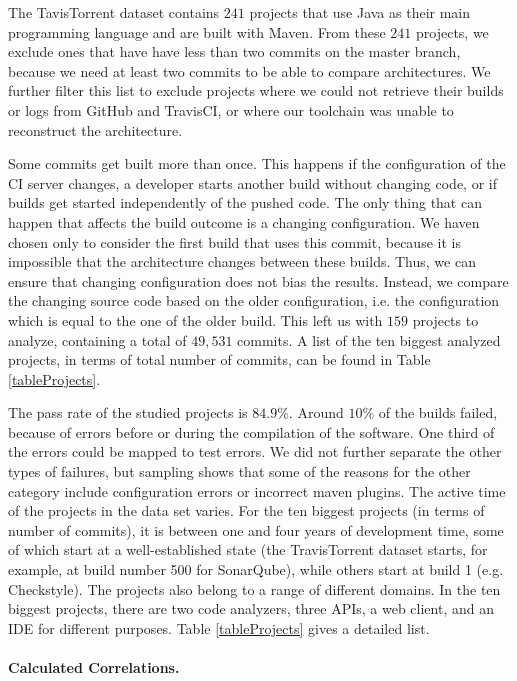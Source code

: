 \documentclass[sigplan, anonymous, review]{acmart}
\begin{document}
The TavisTorrent dataset contains $241$ projects that use Java as their main programming language and are built with Maven. 
From these $241$ projects, we exclude ones that have have less than two commits on the master branch, because we need at least two commits to be able to compare architectures. 
We further filter this list to exclude projects where we could not retrieve their builds or logs from GitHub and TravisCI, or where our toolchain was unable to reconstruct the architecture.

Some commits get built more than once. This happens if the configuration of the CI server changes, a developer starts another build without changing code, or if builds get started independently of the pushed code.
The only thing that can happen that affects the build outcome is a changing configuration. We haven chosen only to consider the first build that uses this commit, because it is impossible that the architecture changes between these builds.
Thus, we can ensure that changing configuration does not bias the results. Instead, we compare the changing source code based on the older configuration, i.e. the configuration which is equal to the one of the older build. 
This left us with $159$ projects to analyze, containing a total of
$49,531$ commits. A list of the ten biggest analyzed projects, in terms of total number of commits, can be found in Table \ref{tableProjects}.

The pass rate of the studied projects is $84.9\%$. Around $10\%$ of the builds failed, because of errors before or during the compilation of the software. One third of the errors could be mapped to test errors. We did not further separate the other types of failures, but sampling shows that some of the reasons for the other category include configuration errors or incorrect maven plugins.
The active time of the projects in the data set varies.
For the ten biggest projects (in terms of number of commits), it is between one and four years of development time, some of which start at a well-established state (the TravisTorrent dataset starts, for example, at build number 500 for SonarQube), while others start at build 1 (e.g. Checkstyle).
The projects also belong to a range of different domains.
In the ten biggest projects, there are two code analyzers, three APIs, a web client, and an IDE for different purposes. Table \ref{tableProjects} gives a detailed list.


\paragraph{Calculated Correlations.}
\end{document}
